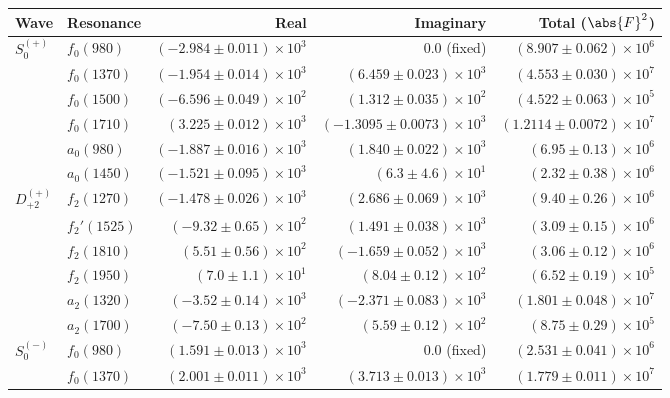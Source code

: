 \begin{table}[ht]
    \begin{center}
        \begin{tabular}{llrrr}\toprule
        Wave & Resonance & Real & Imaginary & Total ($\abs{F}^2$) \\\midrule
$S_{0}^{(+)}$ & $f_{0}(980)$ & $(-2.984 \pm 0.011) \times 10^{3}$ & $0.0$ (fixed) & $(8.907 \pm 0.062) \times 10^{6}$ \\
 & $f_{0}(1370)$ & $(-1.954 \pm 0.014) \times 10^{3}$ & $(6.459 \pm 0.023) \times 10^{3}$ & $(4.553 \pm 0.030) \times 10^{7}$ \\
 & $f_{0}(1500)$ & $(-6.596 \pm 0.049) \times 10^{2}$ & $(1.312 \pm 0.035) \times 10^{2}$ & $(4.522 \pm 0.063) \times 10^{5}$ \\
 & $f_{0}(1710)$ & $(3.225 \pm 0.012) \times 10^{3}$ & $(-1.3095 \pm 0.0073) \times 10^{3}$ & $(1.2114 \pm 0.0072) \times 10^{7}$ \\
 & $a_{0}(980)$ & $(-1.887 \pm 0.016) \times 10^{3}$ & $(1.840 \pm 0.022) \times 10^{3}$ & $(6.95 \pm 0.13) \times 10^{6}$ \\
 & $a_{0}(1450)$ & $(-1.521 \pm 0.095) \times 10^{3}$ & $(6.3 \pm 4.6) \times 10^{1}$ & $(2.32 \pm 0.38) \times 10^{6}$ \\
$D_{+2}^{(+)}$ & $f_{2}(1270)$ & $(-1.478 \pm 0.026) \times 10^{3}$ & $(2.686 \pm 0.069) \times 10^{3}$ & $(9.40 \pm 0.26) \times 10^{6}$ \\
 & $f_{2}'(1525)$ & $(-9.32 \pm 0.65) \times 10^{2}$ & $(1.491 \pm 0.038) \times 10^{3}$ & $(3.09 \pm 0.15) \times 10^{6}$ \\
 & $f_{2}(1810)$ & $(5.51 \pm 0.56) \times 10^{2}$ & $(-1.659 \pm 0.052) \times 10^{3}$ & $(3.06 \pm 0.12) \times 10^{6}$ \\
 & $f_{2}(1950)$ & $(7.0 \pm 1.1) \times 10^{1}$ & $(8.04 \pm 0.12) \times 10^{2}$ & $(6.52 \pm 0.19) \times 10^{5}$ \\
 & $a_{2}(1320)$ & $(-3.52 \pm 0.14) \times 10^{3}$ & $(-2.371 \pm 0.083) \times 10^{3}$ & $(1.801 \pm 0.048) \times 10^{7}$ \\
 & $a_{2}(1700)$ & $(-7.50 \pm 0.13) \times 10^{2}$ & $(5.59 \pm 0.12) \times 10^{2}$ & $(8.75 \pm 0.29) \times 10^{5}$ \\
$S_{0}^{(-)}$ & $f_{0}(980)$ & $(1.591 \pm 0.013) \times 10^{3}$ & $0.0$ (fixed) & $(2.531 \pm 0.041) \times 10^{6}$ \\
 & $f_{0}(1370)$ & $(2.001 \pm 0.011) \times 10^{3}$ & $(3.713 \pm 0.013) \times 10^{3}$ & $(1.779 \pm 0.011) \times 10^{7}$ \\

\end{tabular}
\end{center}
\end{table}
